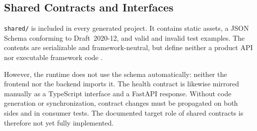 \subsection{Shared Contracts and Interfaces}
\label{subsec:shared-contracts-schnittstellen}

\texttt{shared/} is included in every generated project. It contains static
assets, a JSON Schema conforming to Draft~2020-12, and valid and invalid test
examples. The contents are serializable and framework-neutral, but define
neither a product API nor executable framework code
\parencite{kleiveist2026architecture,kleiveist2026governance-snapshot}.

However, the runtime does not use the schema automatically: neither the
frontend nor the backend imports it. The health contract is likewise mirrored
manually as a TypeScript interface and a FastAPI response. Without code
generation or synchronization, contract changes must be propagated on both
sides and in consumer tests. The documented target role of shared contracts is
therefore not yet fully implemented.
